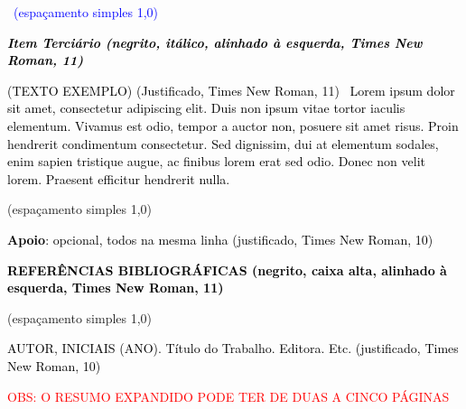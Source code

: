 \documentclass[letterpaper]{report}
\begin{document}
{\centering{}
\foreignlanguage{portuges}{\textcolor{blue}{\ (espaçamento simples 1,0)}}
\par}

{
\foreignlanguage{portuges}{\textbf{\textit{\textcolor{black}{Item Terciário (negrito, itálico, alinhado à esquerda, Times New Roman, 11)}}}}}

{
\textcolor{black}{(TEXTO EXEMPLO)}\foreignlanguage{portuges}{\textcolor{black}{ (Justificado, Times New Roman, 11) }}\textcolor{black}{\ Lorem ipsum dolor sit amet, consectetur adipiscing elit. Duis non ipsum vitae tortor iaculis elementum. Vivamus est odio, tempor a auctor non, posuere sit amet risus. Proin hendrerit condimentum consectetur. Sed dignissim, dui at elementum sodales, enim sapien tristique augue, ac finibus lorem erat sed odio. Donec non velit lorem. Praesent efficitur hendrerit nulla.}}

{\centering{}\color{blue}
(espaçamento simples 1,0)
\par}

{
\foreignlanguage{portuges}{\textbf{\textcolor{black}{Apoio}}}\foreignlanguage{portuges}{\textcolor{black}{: opcional, todos na mesma linha (justificado, Times New Roman, 10)}}}


\bigskip

{
\foreignlanguage{portuges}{\textbf{\textcolor{black}{REFERÊNCIAS BIBLIOGRÁFICAS (negrito, caixa alta, alinhado à esquerda, Times New Roman, 11)}}}}

{\centering{}\color{blue}
(espaçamento simples 1,0)
\par}

{
\foreignlanguage{portuges}{\textcolor{black}{AUTOR, INICIAIS (ANO). Título do Trabalho. Editora. Etc. (justificado, Times New Roman, 10)}}}



\bigskip

{\centering{}
\foreignlanguage{portuges}{\textcolor{red}{OBS: O RESUMO EXPANDIDO PODE TER DE DUAS A CINCO PÁGINAS}}
\par}
\end{document}
